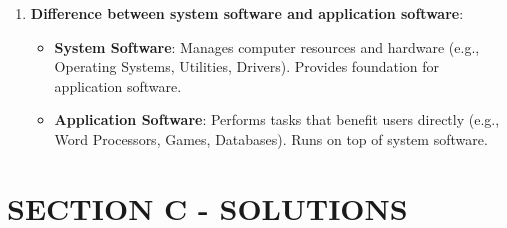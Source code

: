 \documentclass[12pt]{article}
\begin{document}
\begin{enumerate}[left=0pt, label=\bfseries Q\arabic*., start=1]
\begin{enumerate}[label=(\alph*)]
        \item \textbf{Difference between system software and application software}:
        \begin{itemize}
            \item \textbf{System Software}: Manages computer resources and hardware (e.g., Operating Systems, Utilities, Drivers). Provides foundation for application software.
            \item \textbf{Application Software}: Performs tasks that benefit users directly (e.g., Word Processors, Games, Databases). Runs on top of system software.
        \end{itemize}
    \end{enumerate}
\end{enumerate}

\newpage

\section*{SECTION C - SOLUTIONS}
\end{document}
